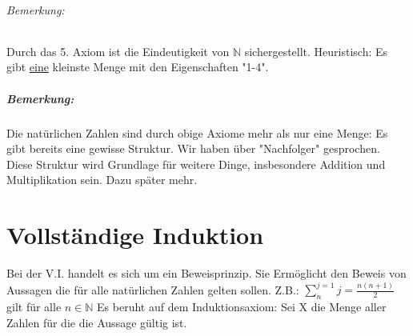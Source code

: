 \subparagraph{Bemerkung:}
Durch das 5. Axiom ist die Eindeutigkeit von $\mathbb{N}$ sichergestellt. Heuristisch: Es gibt \underline{eine} kleinste Menge mit den Eigenschaften "1-4".

\paragraph{Bemerkung:}
Die natürlichen Zahlen sind durch obige Axiome mehr als nur eine Menge: Es gibt bereits eine gewisse Struktur. Wir haben über "Nachfolger" gesprochen. Diese Struktur wird Grundlage für weitere Dinge, insbesondere Addition und Multiplikation sein. Dazu später mehr.

\chapter{Vollständige Induktion}
Bei der V.I. handelt es sich um ein Beweisprinzip. Sie Ermöglicht den Beweis von Aussagen die für alle natürlichen Zahlen gelten sollen.\newline
Z.B.: $\sum_{n}^{j=1} j = \frac{n(n+1)}{2}$ gilt für alle $n \in \mathbb{N}$\newline
Es beruht auf dem Induktionsaxiom:\newline
Sei X die Menge aller Zahlen für die die Aussage gültig ist.

